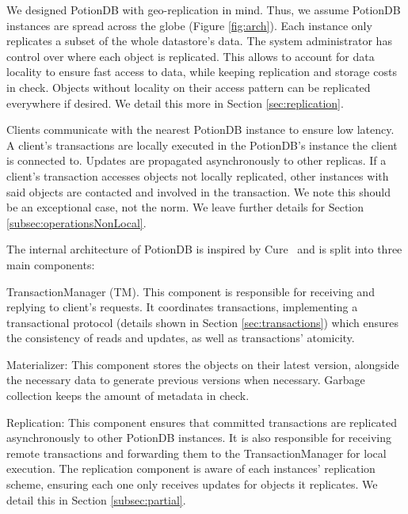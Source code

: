 \documentclass[sigplan,10pt]{acmart}
\begin{document}
We designed PotionDB with geo-replication in mind.
Thus, we assume PotionDB instances are spread across the globe (Figure \ref{fig:arch}).
Each instance only replicates a subset of the whole datastore's data.
The system administrator has control over where each object is replicated.
This allows to account for data locality to ensure fast access to data, while keeping replication and storage costs in check.
Objects without locality on their access pattern can be replicated everywhere if desired.
We detail this more in Section \ref{sec:replication}.

Clients communicate with the nearest PotionDB instance to ensure low latency.
A client's transactions are locally executed in the PotionDB's instance the client is connected to.
Updates are propagated asynchronously to other replicas.
If a client's transaction accesses objects not locally replicated, other instances with said objects are contacted and involved in the transaction.
We note this should be an exceptional case, not the norm.
We leave further details for Section \ref{subsec:operationsNonLocal}.

The internal architecture of PotionDB is inspired by Cure~\cite{cure} and is split into three main components:

\begin{compactitem}
	\item TransactionManager (TM). This component is responsible for receiving and replying to client's requests.
	It coordinates transactions, implementing a transactional protocol (details shown in Section \ref{sec:transactions}) which ensures the consistency of reads and updates, as well as transactions' atomicity.
	\item Materializer: This component stores the objects on their latest version, alongside the necessary data to generate previous versions when necessary.
	Garbage collection keeps the amount of metadata in check.
	\item Replication: This component ensures that committed transactions are replicated asynchronously to other PotionDB instances.
	It is also responsible for receiving remote transactions and forwarding them to the TransactionManager for local execution.
	The replication component is aware of each instances' replication scheme, ensuring each one only receives updates for objects it replicates. We detail this in Section \ref{subsec:partial}.
\end{compactitem}
\end{document}
